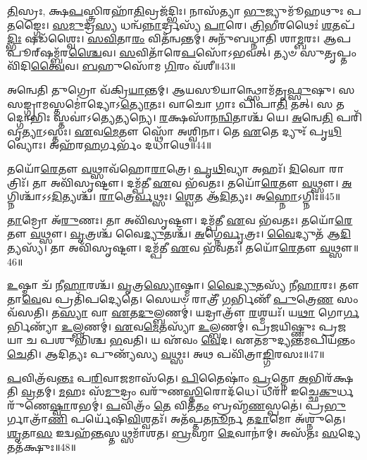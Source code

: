 \-\ul{𑌤𑌿}\-𑌸𑍍𑌰𑌃, 𑌕𑍍𑌷\-\ul{𑌪}\-𑌸𑍍𑌤𑍍𑌰𑌿𑌰𑌹𑌾᳴\-\ul{𑌤𑌿}\-𑌵𑍍𑌰𑌜᳴𑌦𑍍𑌭𑌿𑌃। 𑌨𑌾𑌸᳴𑌤𑍍𑌯𑌾 \ul{𑌭𑍁}\-𑌜𑍍𑌯𑍁𑌮𑍂᳴𑌹𑌥𑍁𑌃 𑌪\-\ul{𑌤}\-𑌙𑍍𑌗𑍈𑌃। 
\-\ul{𑌸}\-\-\ul{𑌮𑍁}\-𑌦𑍍𑌰\-\ul{𑌸𑍍𑌯} 𑌧𑌨𑍍𑌵᳴\-\ul{𑌨𑍍𑌨𑌾}\-𑌰𑍍𑌦𑍍𑌰𑌸𑍍𑌯᳴ \ul{𑌪𑌾}\-𑌰𑍇। \ul{𑌤𑍍𑌰𑌿}\-𑌭𑍀𑌰𑌥𑍈𑌃॑ \ul{𑌶}\-𑌤𑌪᳴\-\ul{𑌦𑍍𑌭𑌿𑌃} 𑌷𑌡᳴𑌶𑍍𑌵𑍈𑌃। 
\-\ul{𑌸}\-\-\ul{𑌵𑌿}\-𑌤𑌾\-\ul{𑌰𑌂} 𑌵𑌿𑌤᳴𑌨𑍍𑌵𑌨𑍍𑌤𑌮𑍍। 𑌅𑌨𑍁᳴𑌬𑌧𑍍𑌨𑌾𑌤𑌿 𑌶𑌾\-\ul{𑌮𑍍𑌬}\-𑌰𑌃। 𑌆𑌪𑌪𑍂𑌰𑍍‌𑌷𑌮𑍍𑌬᳴𑌰\-\ul{𑌶𑍍𑌚𑍈}\-𑌵। 
\-\ul{𑌸}\-𑌵𑌿𑌤𑌾᳴𑌰𑍇\-\ul{𑌪}\-𑌸𑍋᳴𑌽𑌭𑌵𑌤𑍍। 𑌤𑍍𑌯𑍞 𑌸𑍁𑌤𑍃𑌪𑍍𑌤𑌂 𑌵𑌿᳴𑌦𑌿\-\ul{𑌤𑍍𑌵𑍈}\-𑌵। \ul{𑌬}\-𑌹𑍁𑌸𑍋᳴𑌮 \ul{𑌗𑌿}\-𑌰𑌂 𑌵᳴𑌶𑍀॥43॥

𑌅𑌨𑍍𑌵𑍇𑌤𑌿 𑌤𑍁𑌗𑍍𑌰𑍋 𑌵᳴𑌕𑍍𑌰𑌿\-\ul{𑌯𑌾}\-𑌨𑍍𑌤𑌮𑍍। 𑌆𑌯𑌸𑍂𑌯𑌾𑌨𑍍𑌥𑍍𑌸𑍋𑌮᳴𑌤𑍃\-\ul{𑌫𑍍𑌸𑍁}\-𑌷𑍁। 𑌸 \linebreak 𑌸𑌙𑍍𑌗𑍍𑌰𑌾𑌮𑌸𑍍𑌤𑌮𑍋॑𑌦𑍍𑌯𑍋𑌽\-\ul{𑌤𑍍𑌯𑍋}\-𑌤𑌃। 
𑌵𑌾𑌚𑍋 𑌗𑌾𑌃 𑌪𑌿᳴𑌪𑌾\-\ul{𑌤𑌿} 𑌤𑌤𑍍। 𑌸 𑌤𑌦𑍍𑌗𑍋𑌭𑌿𑌃 𑌸𑍍𑌤𑌵𑌾॑𑌽𑌤𑍍𑌯𑍇\-\ul{𑌤𑍍𑌯}\-𑌨𑍍𑌯𑍇। \ul{𑌰}\-𑌕𑍍𑌷𑌸𑌾᳴𑌨\-\ul{𑌨𑍍𑌵𑌿}\-𑌤𑌾𑌶𑍍𑌚᳴ 𑌯𑍇। 
\-\ul{𑌅}\-𑌨𑍍𑌵𑍇\-\ul{𑌤𑌿} 𑌪𑌰𑌿᳴𑌵𑍃\-\ul{𑌤𑍍𑌯𑌾}\-𑌽𑌸𑍍𑌤𑌃। \ul{𑌏}\-𑌵\-\ul{𑌮𑍇}\-𑌤𑍗 𑌸𑍍𑌥𑍋᳴ 𑌅𑌶𑍍𑌵𑌿𑌨𑌾। 
𑌤𑍇 \ul{𑌏}\-𑌤𑍇 𑌦𑍍𑌯𑍁𑌃᳴ 𑌪𑍃\-\ul{𑌥𑌿}\-𑌵𑍍𑌯𑍋𑌃। 𑌅𑌹᳴𑌰\-\ul{𑌹}\-𑌰𑍍𑌗𑌰𑍍𑌭𑌂᳴ 𑌦𑌧𑌾𑌥𑍇॥44॥

𑌤𑌯𑍋᳴\-\ul{𑌰𑍇}\-𑌤𑍗 \ul{𑌵}\-𑌥𑍍𑌸𑌾𑌵᳴𑌹𑍋\-\ul{𑌰𑌾}\-𑌤𑍍𑌰𑍇। \ul{𑌪𑍃}\-\-\ul{𑌥𑌿}\-𑌵𑍍𑌯𑌾 𑌅𑌹𑌃᳴। \ul{𑌦𑌿}\-𑌵𑍋 𑌰𑌾𑌤𑍍𑌰𑌿𑌃᳴। 
𑌤𑌾 𑌅𑌵𑌿᳴𑌸𑍃𑌷𑍍𑌟𑍗। 𑌦𑌮𑍍𑌪᳴𑌤𑍀 \ul{𑌏}\-𑌵 𑌭᳴𑌵𑌤𑌃। 𑌤𑌯𑍋᳴\-\ul{𑌰𑍇}\-𑌤𑍗 \ul{𑌵}\-𑌥𑍍𑌸𑍗। 
\-\ul{𑌅}\-𑌗𑍍𑌨𑌿𑌶𑍍𑌚𑌾᳴𑌽𑌽\-\ul{𑌦𑌿}\-\-\ul{𑌤𑍍𑌯}\-𑌶𑍍𑌚᳴। \ul{𑌰𑌾}\-𑌤𑍍𑌰𑍇\-\ul{𑌰𑍍𑌵}\-𑌥𑍍𑌸𑌃। \ul{𑌶𑍍𑌵𑍇}\-𑌤 𑌆᳴\-\ul{𑌦𑌿}\-𑌤𑍍𑌯𑌃। 𑌅\-\ul{𑌹𑍍𑌨𑍋}\-𑌽𑌗𑍍𑌨𑌿𑌃॥45॥

\-\ul{𑌤𑌾}\-𑌮𑍍𑌰𑍋 𑌅᳴\-\ul{𑌰𑍁}\-𑌣𑌃। 𑌤𑌾 𑌅𑌵𑌿᳴𑌸𑍃𑌷𑍍𑌟𑍗। 𑌦𑌮𑍍𑌪᳴𑌤𑍀 \ul{𑌏}\-𑌵 𑌭᳴𑌵𑌤𑌃। 
𑌤𑌯𑍋᳴\-\ul{𑌰𑍇}\-𑌤𑍗 \ul{𑌵}\-𑌥𑍍𑌸𑍗। \ul{𑌵𑍃}\-𑌤𑍍𑌰𑌶𑍍𑌚᳴ 𑌵𑍈\-\ul{𑌦𑍍𑌯𑍁}\-𑌤𑌶𑍍𑌚᳴। \ul{𑌅}\-𑌗𑍍𑌨𑍇\-\ul{𑌰𑍍𑌵𑍃}\-𑌤𑍍𑌰𑌃। \ul{𑌵𑍈}\-𑌦𑍍𑌯𑍁𑌤᳴ 𑌆\-\ul{𑌦𑌿}\-𑌤𑍍𑌯𑌸𑍍𑌯᳴। 
𑌤𑌾 𑌅𑌵𑌿᳴𑌸𑍃𑌷𑍍𑌟𑍗। 𑌦𑌮𑍍𑌪᳴𑌤𑍀 \ul{𑌏}\-𑌵 𑌭᳴𑌵𑌤𑌃। 𑌤𑌯𑍋᳴\-\ul{𑌰𑍇}\-𑌤𑍗 \ul{𑌵}\-𑌥𑍍𑌸𑍗॥46॥


\-\ul{𑌉}\-𑌷𑍍𑌮𑌾 𑌚᳴ 𑌨𑍀\-\ul{𑌹𑌾}\-𑌰𑌶𑍍𑌚᳴। \ul{𑌵𑍃}\-𑌤𑍍𑌰\-\ul{𑌸𑍍𑌯𑍋}\-𑌷𑍍𑌮𑌾। \ul{𑌵𑍈}\-\-\ul{𑌦𑍍𑌯𑍁}\-𑌤𑌸𑍍𑌯᳴ 𑌨𑍀\-\ul{𑌹𑌾}\-𑌰𑌃। 
𑌤𑍗 𑌤𑌾\-\ul{𑌵𑍇}\-𑌵 𑌪𑍍𑌰𑌤𑌿᳴𑌪𑌦𑍍𑌯𑍇𑌤𑍇। 𑌸𑍇𑌯𑍞 𑌰𑌾𑌤𑍍𑌰𑍀᳴ \ul{𑌗}\-𑌰𑍍𑌭𑌿𑌣𑍀᳴ \ul{𑌪𑍁}\-𑌤𑍍𑌰𑍇\-\ul{𑌣} 𑌸𑌂𑌵᳴𑌸𑌤𑌿। 
𑌤\-\ul{𑌸𑍍𑌯𑌾} 𑌵𑌾 \ul{𑌏}\-𑌤\-\ul{𑌦𑍁}\-𑌲𑍍𑌬𑌣𑌮𑍍‌॑। 𑌯𑌦𑍍𑌰𑌾𑌤𑍍𑌰𑍗᳴ \ul{𑌰}\-𑌶𑍍𑌮𑌯𑌃᳴। 
𑌯\-\ul{𑌥𑌾} 𑌗𑍋\-\ul{𑌰𑍍𑌗}\-𑌰𑍍𑌭𑌿𑌣𑍍𑌯𑌾᳴ \ul{𑌉}\-𑌲𑍍𑌬𑌣𑌮𑍍‌॑। \ul{𑌏}\-𑌵\-\ul{𑌮𑍇}\-𑌤𑌸𑍍𑌯𑌾᳴ \ul{𑌉}\-𑌲𑍍𑌬𑌣𑌮𑍍‌॑। 
𑌪𑍍𑌰𑌜𑌯𑌿𑌷𑍍𑌣𑍁𑌃 𑌪𑍍𑌰𑌜𑌯𑌾 𑌚 𑌪𑌶𑍁𑌭𑌿᳴𑌶𑍍𑌚 \ul{𑌭}\-𑌵𑌤𑌿। 
𑌯 𑌏᳴𑌵𑌂 \ul{𑌵𑍇}\-𑌦। 𑌏𑌤𑌮𑍁𑌦𑍍𑌯𑌨𑍍𑌤𑌮𑌪𑌿𑌯᳴𑌨𑍍𑌤𑌂 \ul{𑌚𑍇}\-𑌤𑌿। 
𑌆𑌦𑌿𑌤𑍍𑌯𑌃 𑌪𑍁𑌣𑍍𑌯᳴𑌸𑍍𑌯 \ul{𑌵}\-𑌥𑍍𑌸𑌃। 𑌅𑌥 𑌪𑌵𑌿᳴𑌤𑍍𑌰𑌾\-\ul{𑌙𑍍𑌗𑌿}\-𑌰𑌸𑌃॥47॥\anuvakamend


\-\ul{𑌪}\-𑌵𑌿𑌤𑍍𑌰᳴𑌵\-\ul{𑌨𑍍𑌤𑌃} 𑌪\-\ul{𑌰𑌿}\-𑌵𑌾\-\ul{𑌜}\-𑌮𑌾𑌸᳴𑌤𑍇। \ul{𑌪𑌿}\-𑌤𑍈𑌷𑌾𑌂॑ \ul{𑌪𑍍𑌰}\-𑌤𑍍𑌨𑍋 \ul{𑌅}\-𑌭𑌿𑌰᳴𑌕𑍍𑌷𑌤𑌿 \ul{𑌵𑍍𑌰}\-𑌤𑌮𑍍। 
\-\ul{𑌮}\-𑌹𑌃 𑌸᳴\-\ul{𑌮𑍁}\-𑌦𑍍𑌰𑌂 𑌵𑌰𑍁᳴𑌣\-\ul{𑌸𑍍𑌤𑌿}\-𑌰𑍋𑌦᳴𑌧𑍇। 𑌧𑍀𑌰𑌾᳴ 𑌇𑌚𑍍𑌛𑍇\-\ul{𑌕𑍁}\-𑌰𑍍𑌧𑌰𑍁᳴𑌣𑍇\-\ul{𑌷𑍍𑌵𑌾}\-𑌰𑌭𑌮𑍍‌॑। 
\-\ul{𑌪}\-𑌵𑌿𑌤𑍍𑌰𑌂᳴ \ul{𑌤𑍇} 𑌵𑌿𑌤᳴\-\ul{𑌤𑌂} 𑌬𑍍𑌰𑌹𑍍𑌮᳴\-\ul{𑌣}\-𑌸𑍍𑌪𑌤𑍇॑। 𑌪𑍍𑌰\-\ul{𑌭𑍁}\-𑌰𑍍𑌗𑌾𑌤𑍍𑌰𑌾᳴\-\ul{𑌣𑌿} 𑌪𑌰𑍍𑌯𑍇᳴𑌷𑌿\-\ul{𑌵𑌿}\-𑌶𑍍𑌵𑌤𑌃᳴। 
𑌅𑌤᳴𑌪𑍍𑌤𑌤\-\ul{𑌨𑍂}\-𑌰𑍍𑌨 𑌤\-\ul{𑌦𑌾}\-𑌮𑍋 𑌅᳴𑌶𑍍𑌨𑍁𑌤𑍇। \ul{𑌶𑍃}\-𑌤𑌾\-\ul{𑌸} 𑌇𑌦𑍍𑌵𑌹᳴\-\ul{𑌨𑍍𑌤}\-𑌸𑍍𑌤𑌥𑍍𑌸𑌮𑌾᳴𑌶𑌤। 
\-\ul{𑌬𑍍𑌰}\-𑌹𑍍𑌮𑌾 \ul{𑌦𑍇}\-𑌵𑌾𑌨𑌾॑𑌮𑍍। 𑌅𑌸᳴𑌤𑌃 \ul{𑌸}\-𑌦𑍍𑌯𑍇 𑌤𑌤᳴𑌕𑍍𑌷𑍁𑌃॥48॥



